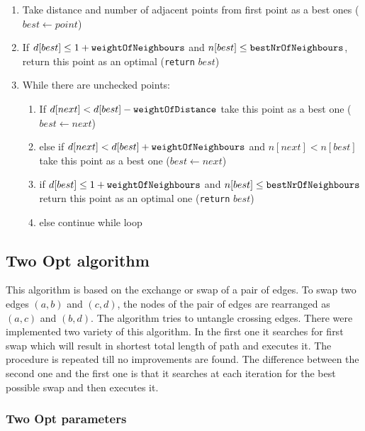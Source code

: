 \documentclass[titlepage]{article}
\begin{document}
\begin{enumerate}
	\item Take distance and number of adjacent points from first point as a best ones ($best \leftarrow point$)
	\item If $d[best] \leq 1 + \mbox{\texttt{weightOfNeighbours}}$ and $n[best] \leq \mbox{\texttt{bestNrOfNeighbours}}$, return this point as an optimal (\texttt{return} $best$)
	\item While there are unchecked points:
	
	\begin{enumerate}[label*=\arabic*.]
		\item If $d[next] < d[best] - \mbox{\texttt{weightOfDistance}}$ take this point as a best one ($best \leftarrow next$)
		\item else if $d[next] < d[best] + \mbox{\texttt{weightOfNeighbours}}$ and $n[next] < n[best]$ take this point as a best one ($best \leftarrow next$)
		\item if $d[best] \leq 1 + \mbox{\texttt{weightOfNeighbours}}$ and $n[best] \leq \mbox{\texttt{bestNrOfNeighbours}}$ return this point as an optimal one (\texttt{return} $best$)
		\item else continue while loop
	\end{enumerate}
\end{enumerate}


\subsection{Two Opt algorithm}

This algorithm is based on the exchange or swap of a pair of edges. To swap two edges $(a, b)$ and $(c, d)$, the nodes of the pair of edges are rearranged as $(a, c)$ and $(b, d)$. The algorithm tries to untangle crossing edges. There were implemented two variety of this algorithm. In the first one it searches for first swap which will result in shortest total length of path and executes it. The procedure is repeated till no improvements are found. The difference between the second one and the first one is that it searches at each iteration for the best possible swap and then executes it.

\subsubsection{Two Opt parameters}
\end{document}
